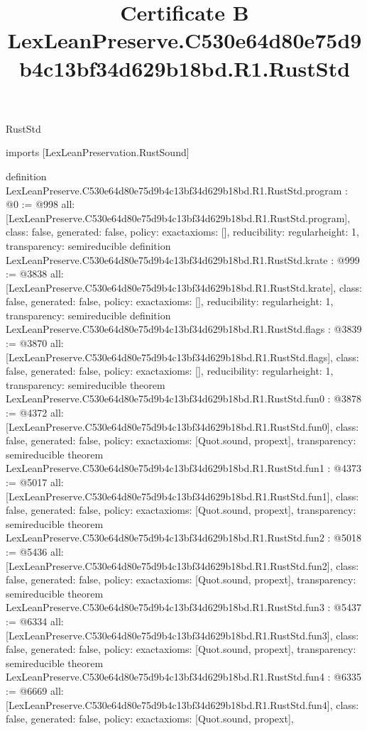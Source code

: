 \begin{lexlean}{RustStd}
\title{Certificate B LexLeanPreserve.C530e64d80e75d9b4c13bf34d629b18bd.R1.RustStd}
\begin{coremodule}
imports [LexLeanPreservation.RustSound]

definition LexLeanPreserve.C530e64d80e75d9b4c13bf34d629b18bd.R1.RustStd.program : @0 := @998 {
  all: [LexLeanPreserve.C530e64d80e75d9b4c13bf34d629b18bd.R1.RustStd.program],
  class: false,
  generated: false,
  policy: exact{axioms: []},
  reducibility: regular{height: 1},
  transparency: semireducible
}
definition LexLeanPreserve.C530e64d80e75d9b4c13bf34d629b18bd.R1.RustStd.krate : @999 := @3838 {
  all: [LexLeanPreserve.C530e64d80e75d9b4c13bf34d629b18bd.R1.RustStd.krate],
  class: false,
  generated: false,
  policy: exact{axioms: []},
  reducibility: regular{height: 1},
  transparency: semireducible
}
definition LexLeanPreserve.C530e64d80e75d9b4c13bf34d629b18bd.R1.RustStd.flags : @3839 := @3870 {
  all: [LexLeanPreserve.C530e64d80e75d9b4c13bf34d629b18bd.R1.RustStd.flags],
  class: false,
  generated: false,
  policy: exact{axioms: []},
  reducibility: regular{height: 1},
  transparency: semireducible
}
theorem LexLeanPreserve.C530e64d80e75d9b4c13bf34d629b18bd.R1.RustStd.fun0 : @3878 := @4372 {
  all: [LexLeanPreserve.C530e64d80e75d9b4c13bf34d629b18bd.R1.RustStd.fun0],
  class: false,
  generated: false,
  policy: exact{axioms: [Quot.sound, propext]},
  transparency: semireducible
}
theorem LexLeanPreserve.C530e64d80e75d9b4c13bf34d629b18bd.R1.RustStd.fun1 : @4373 := @5017 {
  all: [LexLeanPreserve.C530e64d80e75d9b4c13bf34d629b18bd.R1.RustStd.fun1],
  class: false,
  generated: false,
  policy: exact{axioms: [Quot.sound, propext]},
  transparency: semireducible
}
theorem LexLeanPreserve.C530e64d80e75d9b4c13bf34d629b18bd.R1.RustStd.fun2 : @5018 := @5436 {
  all: [LexLeanPreserve.C530e64d80e75d9b4c13bf34d629b18bd.R1.RustStd.fun2],
  class: false,
  generated: false,
  policy: exact{axioms: [Quot.sound, propext]},
  transparency: semireducible
}
theorem LexLeanPreserve.C530e64d80e75d9b4c13bf34d629b18bd.R1.RustStd.fun3 : @5437 := @6334 {
  all: [LexLeanPreserve.C530e64d80e75d9b4c13bf34d629b18bd.R1.RustStd.fun3],
  class: false,
  generated: false,
  policy: exact{axioms: [Quot.sound, propext]},
  transparency: semireducible
}
theorem LexLeanPreserve.C530e64d80e75d9b4c13bf34d629b18bd.R1.RustStd.fun4 : @6335 := @6669 {
  all: [LexLeanPreserve.C530e64d80e75d9b4c13bf34d629b18bd.R1.RustStd.fun4],
  class: false,
  generated: false,
  policy: exact{axioms: [Quot.sound, propext]},
}
\end{coremodule}
\end{lexlean}
